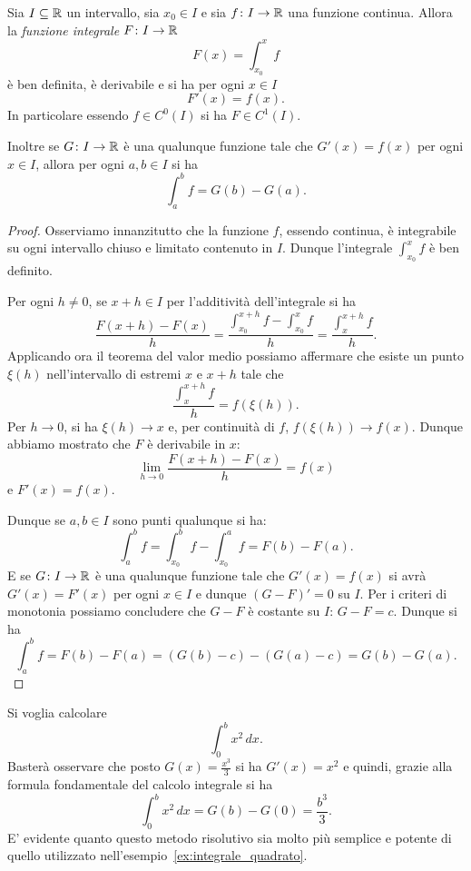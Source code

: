 \begin{theorem}
\mymark{***}%
%
%
%
\label{th:torricelli-barrow}
Sia $I\subseteq \mathbb R$ un intervallo, sia $x_0 \in I$
 e sia $f\colon I\to \mathbb R$ una funzione continua.
Allora la \emph{funzione integrale}
$F\colon I \to \mathbb R$
\[
  F(x) = \int_{x_0}^x f
\]
è ben definita, è derivabile e si ha per ogni $x\in I$
\[
  F'(x) = f(x).
\]
In particolare essendo $f\in C^0(I)$ si ha $F\in C^1(I)$.

Inoltre se $G\colon I \to \mathbb R$ è una qualunque funzione tale che
$G'(x) = f(x)$ per ogni $x\in I$, allora per ogni $a,b \in I$ si ha
%
\[
  \int_a^b f = G(b) - G(a).
\]
\end{theorem}
%
\begin{proof}
\mymark{***}
Osserviamo innanzitutto che la funzione $f$, essendo continua, è integrabile
su ogni intervallo chiuso e limitato contenuto in $I$. Dunque l'integrale
$\int_{x_0}^x f$ è ben definito.

Per ogni $h\neq 0$, se $x+h \in I$ per l'additività dell'integrale
si ha
\[
\frac{F(x+h) - F(x)}{h} = \frac{\int_{x_0}^{x+h} f - \int_{x_0}^x f}{h}
 = \frac{\int_x^{x+h} f}{h}.
\]
Applicando ora il teorema del valor medio possiamo
affermare che esiste un punto $\xi(h)$ nell'intervallo di estremi $x$ e $x+h$
tale che
\[
  \frac{\int_x^{x+h} f}{h} = f(\xi(h)).
\]
Per $h\to 0$, si ha $\xi(h) \to x$ e, per continuità di $f$,
$f(\xi(h)) \to f(x)$.
Dunque abbiamo mostrato che $F$ è derivabile in $x$:
\[
 \lim_{h\to 0}\frac{F(x+h)-F(x)}{h} = f(x)
\]
e $F'(x) = f(x)$.

Dunque se $a,b\in I$ sono punti qualunque si ha:
\[
\int_a^b f = \int_{x_0}^b f - \int_{x_0}^a f = F(b) - F(a).
\]
E se $G\colon I \to \mathbb R$ è una qualunque  funzione tale che $G'(x)=f(x)$ si
avrà $G'(x) = F'(x)$ per ogni $x\in I$ e dunque $(G-F)' = 0$ su $I$.
Per i criteri di monotonia possiamo concludere che $G-F$ è costante su $I$:
$G-F = c$. Dunque si ha
\[
 \int_a^b f = F(b) - F(a) = (G(b) - c) - (G(a) - c) = G(b) - G(a).
\]
\end{proof}

\begin{example}
Si voglia calcolare
\[
  \int_0^b x^2\, dx.
\]
Basterà osservare che posto $G(x)=\frac{x^3}{3}$ si ha $G'(x)=x^2$
e quindi, grazie alla formula fondamentale del calcolo integrale si
ha
\[
  \int_0^b x^2\, dx = G(b) - G(0) = \frac{b^3}{3}.
\]
E' evidente quanto questo metodo risolutivo sia molto più semplice
e potente di quello utilizzato nell'esempio~\ref{ex:integrale_quadrato}.
\end{example}

